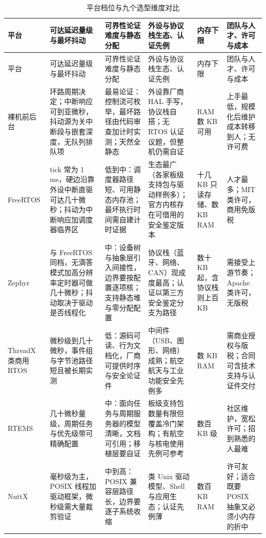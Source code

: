 \documentclass[12pt,a4paper,fontset=fandol]{ctexbook}
\begin{document}
\begin{longtable}{>{\raggedright\arraybackslash\footnotesize}p{}>{\raggedright\arraybackslash\footnotesize}p{}>{\raggedright\arraybackslash\footnotesize}p{}>{\raggedright\arraybackslash\footnotesize}p{}>{\raggedright\arraybackslash\footnotesize}p{}>{\raggedright\arraybackslash\footnotesize}p{}}
\caption{平台档位与九个选型维度对比}\label{tab:apC-platform} \\
\toprule
平台 & 可达延迟量级与最坏抖动 & 可界性论证难度与静态分配 & 外设与协议栈生态、认证先例 & 内存下限 & 团队与人才、许可与成本 \\
\midrule
\endfirsthead
\toprule
平台 & 可达延迟量级与最坏抖动 & 可界性论证难度与静态分配 & 外设与协议栈生态、认证先例 & 内存下限 & 团队与人才、许可与成本 \\
\midrule
\endhead
\bottomrule
\endfoot
\endlastfoot
裸机前后台 & 环路周期决定；中断响应可到亚微秒，抖动源为关中断段与嵌套深度，无队列排队项 & 最易论证：控制流可枚举，最坏路径由代码审查加计时实测；天然全静态 & 外设靠厂商 HAL 手写，协议栈自搭；无 RTOS 认证议题，但整机仍需自证 & RAM 数 KB 可用 & 上手最低，规模化后维护成本转移到人；无许可费 \\
FreeRTOS & tick 常为 1\,ms，硬边沿靠外设中断直驱可达几十微秒；抖动为中断响应加调度器临界区 & 低到中：调度器路径短、可用静态内存池；最坏执行时间需自建计时证据 & 生态最广（各家板级支持包与驱动样例多）；官方内核存在可借用的安全鉴定版本 & 十几 KB 只读存储、数 KB RAM & 人才最多；MIT 类许可，商用免版税 \\
Zephyr & 与 FreeRTOS 同档，无滴答模式加高分辨率定时器可做几十微秒；抖动取决于驱动是否线程化 & 中：设备树与抽象层引入间接性，边界要按配置逐项核；支持静态堆与零分配配置 & 协议栈（蓝牙、网络、CAN）现成度最高；认证以第三方安全鉴定分支为路径 & 数十 KB 起，含协议栈则上百 KB & 需接受上游节奏；Apache 类许可，无版税 \\
ThreadX 类商用 RTOS & 微秒级到几十微秒，事件组与字节池路径短且被长期实测 & 低：源码可读、行为文档化，厂商可提供时序与安全论证件 & 中间件（USB、图形、网络）成熟；航空航天与工业功能安全先例多 & 数 KB RAM & 需商业授权与版税；合同可含技术支持与认证件交付 \\
RTEMS & 几十微秒量级，周期任务与优先级带可精确配置 & 中：面向任务与周期服务器的模型清晰，文档可引用；移植层要自证 & 板级支持包数量有限但覆盖冷门架构；有航空与核电使用先例可参考 & 数百 KB 级 & 社区维护，宽松许可；招到熟悉的人最难 \\
NuttX & 毫秒级为主，POSIX 线程加驱动框架，微秒级需大量裁剪验证 & 中到高：POSIX 兼容层路径长，边界要逐子系统收缩 & 类 Unix 驱动模型、Shell 与应用生态；认证先例薄 & 数百 KB RAM & 许可友好；适合既要 POSIX 抽象又必须小内存的折中 \\

\end{longtable}
\end{document}
